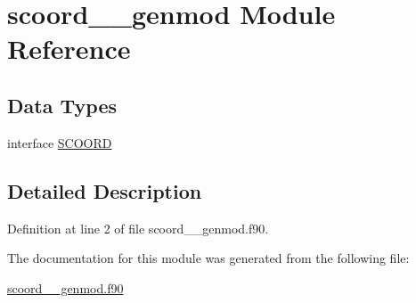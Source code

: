 \hypertarget{classscoord____genmod}{\section{scoord\+\_\+\+\_\+genmod Module Reference}
\label{classscoord____genmod}
}
\subsection*{Data Types}
\begin{DoxyCompactItemize}
\item 
interface \hyperlink{interfacescoord____genmod_1_1SCOORD}{S\+C\+O\+O\+R\+D}
\end{DoxyCompactItemize}


\subsection{Detailed Description}


Definition at line 2 of file scoord\+\_\+\+\_\+genmod.\+f90.



The documentation for this module was generated from the following file\+:\begin{DoxyCompactItemize}
\item 
\hyperlink{scoord____genmod_8f90}{scoord\+\_\+\+\_\+genmod.\+f90}\end{DoxyCompactItemize}
